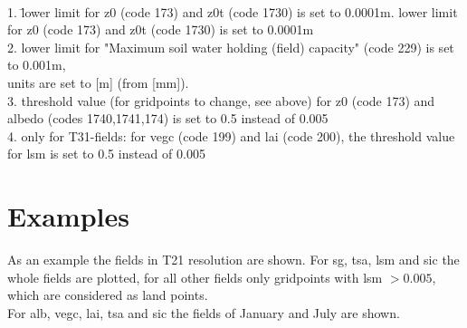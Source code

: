 \\
\vspace{-4.ex}
\begin{tabbing}
1. \= lower limit for z0 (code 173) and z0t (code 1730) is set to 0.0001m. \> lower limit for z0 (code 173) and z0t (code 1730) is set to 0.0001m\\
2. \> lower limit for "Maximum soil water holding (field) capacity" (code 229) is set to 0.001m, \\
   \> units are set to [m] (from [mm]).\\
3. \> threshold value (for gridpoints to change, see above) for z0 (code 173) and \\ 
   \> albedo (codes 1740,1741,174) is set to 0.5 instead of 0.005\\
4. \> only for T31-fields: for vegc (code 199) and lai (code 200), the threshold value \\
   \> for lsm is set to 0.5 instead of 0.005\\
\end{tabbing}

\section{Examples}
As an example the fields in T21 resolution are shown. For sg, tsa, lsm and sic the whole fields are plotted,
for all other fields only gridpoints with lsm $> 0.005$, which are considered as land points.\\
\noindent For alb, vegc, lai, tsa and sic the fields of January and July are shown.
\vspace{2.ex}

